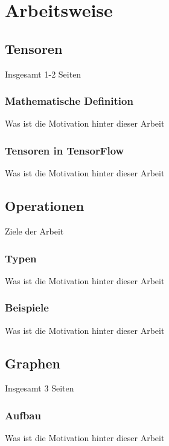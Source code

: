 \chapter{Arbeitsweise}
\label{chap:arbeitsweise}

\section{Tensoren}
\label{sec:tensoren}
\printsubchapterauthor{\authorNiklas}
Insgesamt 1-2 Seiten

\subsection{Mathematische Definition}
\label{sec:mathematischeDefinition}
Was ist die Motivation hinter dieser Arbeit

\subsection{Tensoren in TensorFlow}
\label{sec:tensorenInTensorflow}
Was ist die Motivation hinter dieser Arbeit

\section{Operationen}
\label{sec:operationen}
\printsubchapterauthor{\authorMarco}
Ziele der Arbeit

\subsection{Typen}
\label{sec:typen}
Was ist die Motivation hinter dieser Arbeit

\subsection{Beispiele}
\label{sec:beispiele}
Was ist die Motivation hinter dieser Arbeit

\section{Graphen}
\label{sec:graphen}
\printsubchapterauthor{\authorNiklas}
Insgesamt 3 Seiten

\subsection{Aufbau}
\label{sec:graphenAufbau}
Was ist die Motivation hinter dieser Arbeit


